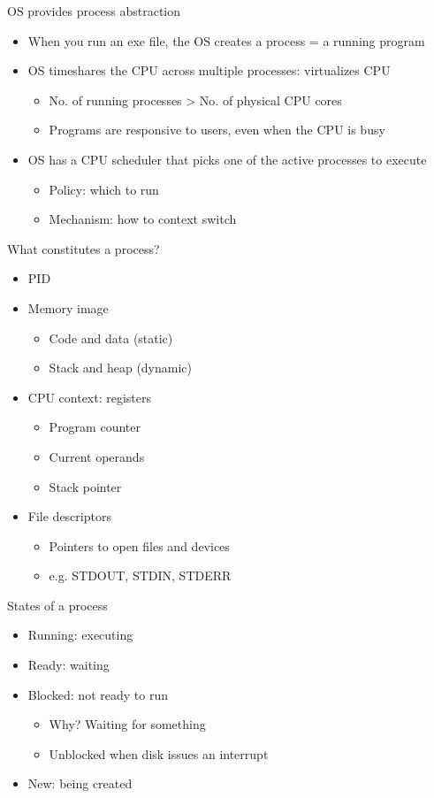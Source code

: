 \documentclass[12pt]{article}
\begin{document}
OS provides process abstraction
\begin{itemize}
    \item When you run an exe file, the OS creates a process = a running program
    \item OS timeshares the CPU across multiple processes: virtualizes CPU
    \begin{itemize}
        \item No. of running processes > No. of physical CPU cores
        \item Programs are responsive to users, even when the CPU is busy
    \end{itemize}
    \item OS has a CPU scheduler that picks one of the active processes to execute
    \begin{itemize}
        \item Policy: which to run
        \item Mechanism: how to context switch
    \end{itemize}
\end{itemize}

What constitutes a process?
\begin{itemize}
    \item PID
    \item Memory image
    \begin{itemize}
        \item Code and data (static)
        \item Stack and heap (dynamic)
    \end{itemize}
    \item CPU context: registers
    \begin{itemize}
        \item Program counter
        \item Current operands
        \item Stack pointer
    \end{itemize}
    \item File descriptors
    \begin{itemize}
        \item Pointers to open files and devices
        \item e.g. STDOUT, STDIN, STDERR
    \end{itemize}
\end{itemize}

States of a process
\begin{itemize}
    \item Running: executing
    \item Ready: waiting
    \item Blocked: not ready to run
    \begin{itemize}
        \item Why? Waiting for something
        \item Unblocked when disk issues an interrupt
    \end{itemize}
    \item New: being created
\end{itemize}
\end{document}
